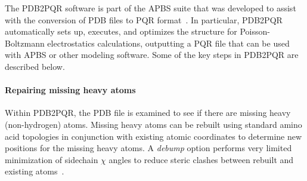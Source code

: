 \documentclass[12pt,titlepage]{article}
\newcommand{\revision}[1]{#1}
\begin{document}
The PDB2PQR software is part of the APBS suite that was developed to assist with the conversion of PDB files to PQR format~\cite{Dolinsky2004, Dolinsky2007}.
In particular, PDB2PQR automatically sets up, executes, and optimizes the structure for Poisson-Boltzmann electrostatics calculations, outputting a PQR file that can be used with APBS or other modeling software.
Some of the key steps in PDB2PQR are described below.

\paragraph{Repairing missing heavy atoms}
Within PDB2PQR, the PDB file is examined to see if there are missing heavy (non-hydrogen) atoms.
Missing heavy atoms can be rebuilt using standard amino acid topologies in conjunction with existing atomic coordinates to determine new positions for the missing heavy atoms.
\revision{A \textit{debump} option performs very limited minimization of sidechain $\chi$ angles to reduce steric clashes between rebuilt and existing atoms~\cite{Dolinsky2004}.}
\end{document}
